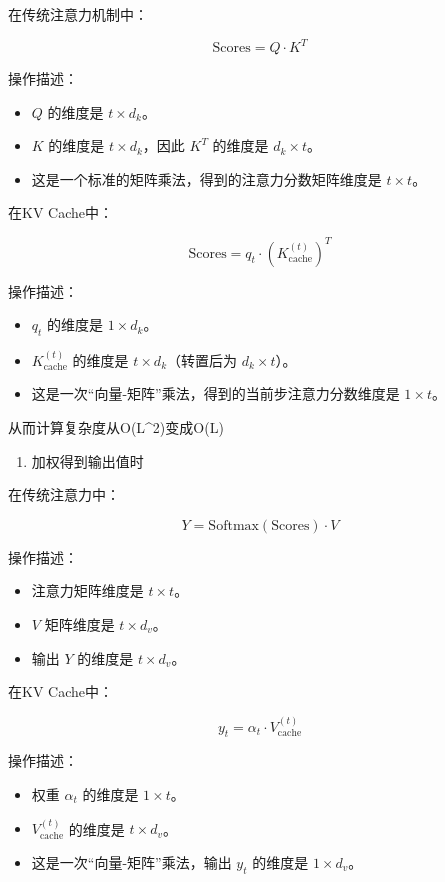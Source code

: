 在传统注意力机制中：

\[
\mathrm{Scores} = Q \cdot K^T
\]

操作描述：

\begin{itemize}
\tightlist
\item
  \(Q\) 的维度是 \(t \times d_k\)。
\item
  \(K\) 的维度是 \(t \times d_k\)，因此 \(K^T\) 的维度是 \(d_k \times t\)。
\item
  这是一个标准的矩阵乘法，得到的注意力分数矩阵维度是 \(t \times t\)。
\end{itemize}

在KV Cache中：

\[
\mathrm{Scores} = q_t \cdot (K_{\mathrm{cache}}^{(t)})^T
\]

操作描述：

\begin{itemize}
\tightlist
\item
  \(q_t\) 的维度是 \(1 \times d_k\)。
\item
  \(K_{\mathrm{cache}}^{(t)}\) 的维度是 \(t \times d_k\)（转置后为 \(d_k \times t\)）。
\item
  这是一次``向量-矩阵''乘法，得到的当前步注意力分数维度是 \(1 \times t\)。
\end{itemize}

从而计算复杂度从O(L\^{}2)变成O(L)

\begin{enumerate}
\def\labelenumi{\arabic{enumi}.}
\setcounter{enumi}{2}
\tightlist
\item
  加权得到输出值时
\end{enumerate}

在传统注意力中：

\[
Y = \mathrm{Softmax}(\mathrm{Scores}) \cdot V
\]

操作描述：

\begin{itemize}
\tightlist
\item
  注意力矩阵维度是 \(t \times t\)。
\item
  \(V\) 矩阵维度是 \(t \times d_v\)。
\item
  输出 \(Y\) 的维度是 \(t \times d_v\)。
\end{itemize}

在KV Cache中：

\[
y_t = \alpha_t \cdot V_{\mathrm{cache}}^{(t)}
\]

操作描述：

\begin{itemize}
\tightlist
\item
  权重 \(\alpha_t\) 的维度是 \(1 \times t\)。
\item
  \(V_{\mathrm{cache}}^{(t)}\) 的维度是 \(t \times d_v\)。
\item
  这是一次``向量-矩阵''乘法，输出 \(y_t\) 的维度是 \(1 \times d_v\)。
\end{itemize}


